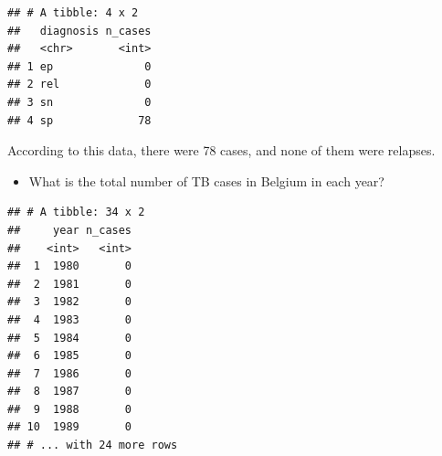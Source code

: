 \documentclass[]{tufte-book}
\newenvironment{Shaded}{}{}
\newcommand{\DataTypeTok}[1]{\textcolor[rgb]{0.56,0.13,0.00}{#1}}
\newcommand{\DecValTok}[1]{\textcolor[rgb]{0.25,0.63,0.44}{#1}}
\newcommand{\KeywordTok}[1]{\textcolor[rgb]{0.00,0.44,0.13}{\textbf{#1}}}
\newcommand{\NormalTok}[1]{#1}
\newcommand{\OperatorTok}[1]{\textcolor[rgb]{0.40,0.40,0.40}{#1}}
\newcommand{\StringTok}[1]{\textcolor[rgb]{0.25,0.44,0.63}{#1}}
\providecommand{\tightlist}{%
  \setlength{\itemsep}{0pt}\setlength{\parskip}{0pt}}
\begin{document}
\begin{Shaded}
\end{Shaded}

\begin{verbatim}
## # A tibble: 4 x 2
##   diagnosis n_cases
##   <chr>       <int>
## 1 ep              0
## 2 rel             0
## 3 sn              0
## 4 sp             78
\end{verbatim}

According to this data, there were 78 cases, and none of them were relapses.

\begin{itemize}
\tightlist
\item
  What is the total number of TB cases in Belgium in each year?
\end{itemize}

\begin{Shaded}
\end{Shaded}

\begin{verbatim}
## # A tibble: 34 x 2
##     year n_cases
##    <int>   <int>
##  1  1980       0
##  2  1981       0
##  3  1982       0
##  4  1983       0
##  5  1984       0
##  6  1985       0
##  7  1986       0
##  8  1987       0
##  9  1988       0
## 10  1989       0
## # ... with 24 more rows
\end{verbatim}
\end{document}
